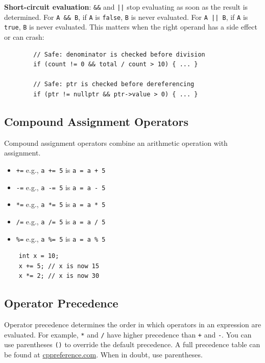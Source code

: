 \begin{remark}
	\textbf{Short-circuit evaluation}: \texttt{\&\&} and \texttt{||} stop evaluating as soon as the result is determined. For \texttt{A \&\& B}, if \texttt{A} is \texttt{false}, \texttt{B} is never evaluated. For \texttt{A || B}, if \texttt{A} is \texttt{true}, \texttt{B} is never evaluated. This matters when the right operand has a side effect or can crash:
	\begin{lstlisting}
		// Safe: denominator is checked before division
		if (count != 0 && total / count > 10) { ... }

		// Safe: ptr is checked before dereferencing
		if (ptr != nullptr && ptr->value > 0) { ... }
	\end{lstlisting}
\end{remark}

\subsection{Compound Assignment Operators}
Compound assignment operators combine an arithmetic operation with assignment.
\begin{itemize}
	\item \texttt{+=} e.g., \texttt{a += 5} is \texttt{a = a + 5}
	\item \texttt{-=} e.g., \texttt{a -= 5} is \texttt{a = a - 5}
	\item \texttt{*=} e.g., \texttt{a *= 5} is \texttt{a = a * 5}
	\item \texttt{/=} e.g., \texttt{a /= 5} is \texttt{a = a / 5}
	\item \texttt{\%=} e.g., \texttt{a \%= 5} is \texttt{a = a \% 5}
\end{itemize}
\begin{lstlisting}
	int x = 10;
	x += 5; // x is now 15
	x *= 2; // x is now 30
\end{lstlisting}

\subsection{Operator Precedence}
Operator precedence determines the order in which operators in an expression are evaluated. For example, \texttt{*} and \texttt{/} have higher precedence than \texttt{+} and \texttt{-}. You can use parentheses \texttt{()} to override the default precedence. A full precedence table can be found at \href{https://en.cppreference.com/w/cpp/language/operator_precedence}{cppreference.com}. When in doubt, use parentheses.

